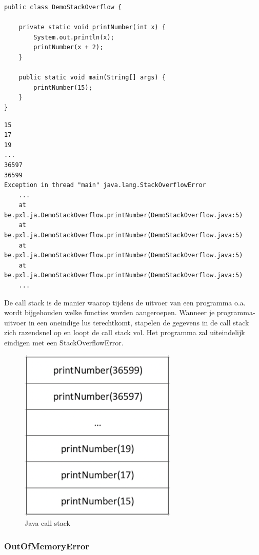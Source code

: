 \begin{lstlisting}
public class DemoStackOverflow {

	private static void printNumber(int x) {
		System.out.println(x);
		printNumber(x + 2);
	}

	public static void main(String[] args) {
		printNumber(15);
	}
}
\end{lstlisting}

\begin{verbatim}
15
17
19
...
36597
36599
Exception in thread "main" java.lang.StackOverflowError
	...
	at be.pxl.ja.DemoStackOverflow.printNumber(DemoStackOverflow.java:5)
	at be.pxl.ja.DemoStackOverflow.printNumber(DemoStackOverflow.java:5) 
	at be.pxl.ja.DemoStackOverflow.printNumber(DemoStackOverflow.java:5) 
	at be.pxl.ja.DemoStackOverflow.printNumber(DemoStackOverflow.java:5) 
	...
\end{verbatim}

De call stack is de manier waarop tijdens de uitvoer van een programma o.a. wordt bijgehouden welke functies worden aangeroepen. Wanneer je programma-uitvoer in een oneindige lus terechtkomt, stapelen de gegevens in de call stack zich razendsnel op en loopt de call stack vol. Het programma zal uiteindelijk eindigen met een StackOverflowError.

\begin{figure}[H]
\includegraphics{images/h2/java_call_stack.png}
\caption{Java call stack}
\label{fig:call_stack}
\end{figure}


\subsubsection{OutOfMemoryError}

